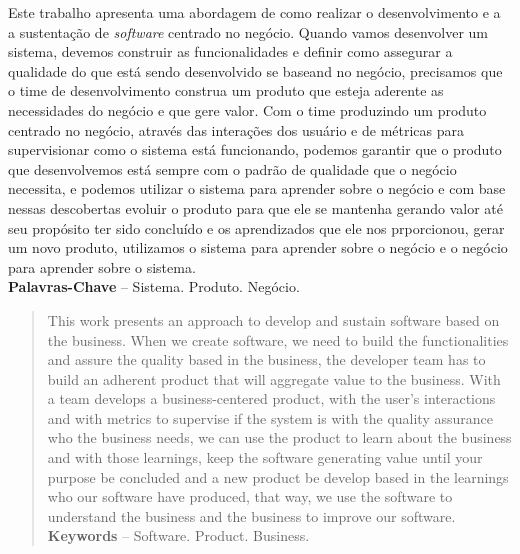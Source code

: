 \begin{resumo}
    Este trabalho apresenta uma abordagem de como realizar o desenvolvimento e a
    a sustentação de \textit{software} centrado no negócio. Quando vamos
    desenvolver um sistema, devemos construir as funcionalidades e definir como
    assegurar a qualidade do que está sendo desenvolvido se baseand no
    negócio, precisamos que o time de desenvolvimento construa um produto que esteja
    aderente as necessidades do negócio e que gere valor. Com o time produzindo
    um produto centrado no negócio, através das interações dos usuário e de métricas
    para supervisionar como o sistema está funcionando, podemos garantir que o
    produto que desenvolvemos está sempre com o padrão de qualidade que o negócio
    necessita, e podemos utilizar o sistema para aprender sobre o negócio e com
    base nessas descobertas evoluir o produto para que ele se mantenha gerando valor
    até seu propósito ter sido concluído e os aprendizados que ele nos prporcionou,
    gerar um novo produto, utilizamos o sistema para aprender sobre o negócio e o
    negócio para aprender sobre o sistema. \\[3\baselineskip]

  \textbf{Palavras-Chave} -- Sistema. Produto. Negócio.
\end{resumo}

\begin{abstract}
  This work presents an approach to develop and sustain software based on the
  business. When we create software, we need to build the functionalities and
  assure the quality based in the business, the developer team has to build an
  adherent product that will aggregate value to the business. With a team develops
  a business-centered product, with the user's interactions and with metrics to
  supervise if the system is with the quality assurance who the business needs,
  we can use the product to learn about the business and with those learnings,
  keep the software generating value until your purpose be concluded and a new
  product be develop based in the learnings who our software have produced, that
  way, we use the software to understand the business and the business to improve
  our software. \\[3\baselineskip]

  \textbf{Keywords} -- Software. Product. Business.
\end{abstract}
